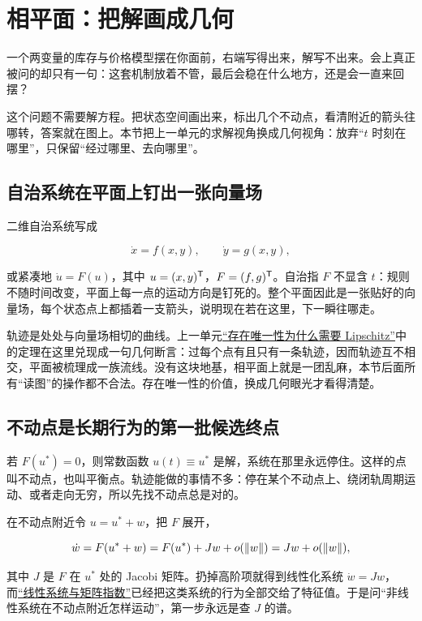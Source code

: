 \section{相平面：把解画成几何}
\label{sec:15-Differential-Equations-and-Dynamical-Systems/02-Stability-and-Dynamical-Systems/01}

一个两变量的库存与价格模型摆在你面前，右端写得出来，解写不出来。会上真正被问的却只有一句：这套机制放着不管，最后会稳在什么地方，还是会一直来回摆？

这个问题不需要解方程。把状态空间画出来，标出几个不动点，看清附近的箭头往哪转，答案就在图上。本节把上一单元的求解视角换成几何视角：放弃``\(t\) 时刻在哪里''，只保留``经过哪里、去向哪里''。

\subsection{自治系统在平面上钉出一张向量场}

二维自治系统写成

\[
\dot x=f(x,y),
\qquad
\dot y=g(x,y),
\]

或紧凑地 \(\dot u=F(u)\)，其中 \(u=(x,y)^{\mathsf{T}}\)，\(F=(f,g)^{\mathsf{T}}\)。自治指 \(F\) 不显含 \(t\)：规则不随时间改变，平面上每一点的运动方向是钉死的。整个平面因此是一张贴好的向量场，每个状态点上都插着一支箭头，说明现在若在这里，下一瞬往哪走。

轨迹是处处与向量场相切的曲线。上一单元\hyperref[sec:15-Differential-Equations-and-Dynamical-Systems/01-ODE-Theory/03]{``存在唯一性为什么需要 Lipschitz''}中的定理在这里兑现成一句几何断言：过每个点有且只有一条轨迹，因而轨迹互不相交，平面被梳理成一族流线。没有这块地基，相平面上就是一团乱麻，本节后面所有``读图''的操作都不合法。存在唯一性的价值，换成几何眼光才看得清楚。

\subsection{不动点是长期行为的第一批候选终点}

若 \(F(u^\ast)=0\)，则常数函数 \(u(t)\equiv u^\ast\) 是解，系统在那里永远停住。这样的点叫不动点，也叫平衡点。轨迹能做的事情不多：停在某个不动点上、绕闭轨周期运动、或者走向无穷，所以先找不动点总是对的。

在不动点附近令 \(u=u^\ast+w\)，把 \(F\) 展开，

\[
\dot w=F(u^\ast+w)=F(u^\ast)+Jw+o(\left\lVert w\right\rVert)=Jw+o(\left\lVert w\right\rVert),
\]

其中 \(J\) 是 \(F\) 在 \(u^\ast\) 处的 Jacobi 矩阵。扔掉高阶项就得到线性化系统 \(\dot w=Jw\)，而\hyperref[sec:15-Differential-Equations-and-Dynamical-Systems/01-ODE-Theory/02]{``线性系统与矩阵指数''}已经把这类系统的行为全部交给了特征值。于是问``非线性系统在不动点附近怎样运动''，第一步永远是查 \(J\) 的谱。

